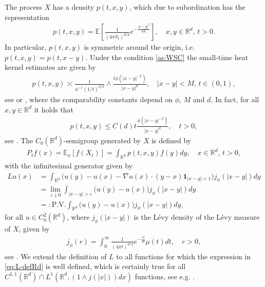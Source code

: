 \documentclass[12pt,a4paper,onecolumn]{article}
\theoremstyle{definition}
\newcommand{\R}{\mathbb{R}}
\newcommand{\ex}{\mathds{E}}
\newcommand{\1}{\mathbf 1}
\numberwithin{equation}{section}
\begin{document}
    The process $X$ has a density $p(t,x,y)$, which due to subordination has the representation 
    \begin{align}\label{eq:SBM dens}
        p(t,x,y)=\ex\left[\frac{1}{(4\pi S_t)^{d/2}}e^{-\frac{|x-y|^2}{4S_t}}\right],\quad x,y\in \R^d,\, t>0.
    \end{align}
    In particular, $p(t,x,y)$ is symmetric around the
	origin, i.e. $p(t,x,y)=p(t,x-y)$. Under the condition \ref{as:WSC} the small-time heat kernel estimates are given by
	\begin{align*}
		p(t,x,y)\asymp \frac{1}{\phi^{-1}(1/t)^{d/2}}\wedge
		\frac{t\phi(|x-y|^{-2})}{|x-y|^{d}},\quad |x-y|<M, \, t\in (0,1),
	\end{align*}
		see \cite{Mimica-heatSBM-proceed16} or \cite{bogdan_density_and_tails_unimodal}, where the comparability constants depend on $\phi$, $M$ and $d$.
	In fact, for all $x,y\in \R^d$ it holds that 
	\begin{align}\label{eq:den-tails bnd}
		p(t,x,y)\le C(d)t\frac{\phi(|x-y|^{-2})}{|x-y|^d},\quad t>0,
	\end{align}
	see \cite[Corollary 7]{bogdan_density_and_tails_unimodal}.
    The $C_0(\R^d)$-semigroup generated by $X$ is defined by
    \begin{align*}
        P_tf(x)=\ex_{x}[f(X_t)]=\int_{\R^d} p(t,x,y)f(y)dy,\quad x\in \R^d,\,t>0,
    \end{align*}
    with the infinitesimal generator given by 
        \begin{align}
            Lu(x)&=\int_{\R^d}\big(u(y)-u(x)-\nabla u(x)\cdot (y-x)\1_{|x-y|<1}\big)j_\phi(|x-y|)dy\nonumber\\
            &=\lim_{\varepsilon\downarrow 0}\int_{|x-y|> \varepsilon}\big(u(y)-u(x)\big)j_\phi(|x-y|)dy\nonumber\\
            &=:\textrm{P.V.}\int_{\R^d}\big(u(y)-u(x)\big)j_\phi(|x-y|)dy,\label{eq:L-defRd}
        \end{align}
        for all $u\in C_0^2(\R^d)$, where $j_\phi(|x-y|)$ is the L\'evy density of the L\'evy measure of $X$, given by
        \begin{align}\label{eq:jumping jphi}
            j_\phi(r)=\int_0^\infty \frac{1}{(4\pi t)^{d/2}}e^{-\frac{r^2}{4t}}\mu(t)dt,\quad r>0,
        \end{align}
        see \cite[Chapter 6]{sato}.
        We extend the definition of $L$ to all functions for which the expression in \eqref{eq:L-defRd} is well defined, which is certainly true for all $C^{1,1}(\R^d)\cap L^1(\R^d,(1\wedge j(|x|))dx)$ functions, see e.g. \cite[Section 3]{BogBycz-PoteThe1999}.
\end{document}
